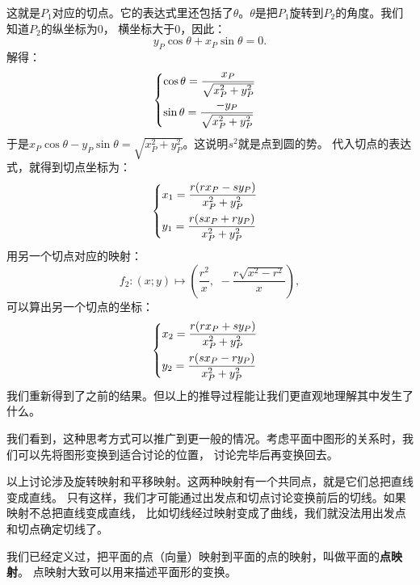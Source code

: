 \documentclass[12pt,UTF8]{ctexbook}
\begin{document}
这就是$P_1$对应的切点。它的表达式里还包括了$\theta$。$\theta$是把$P_1$旋转到$P_2$的角度。我们知道$P_2$的纵坐标为$0$，
横坐标大于$0$，因此：
$$ y_P \cos{\theta} + x_P\sin{\theta} = 0. $$
解得：
\begin{alignat*}{1}
&   \begin{dcases}
        \cos{\theta} = \frac{x_P}{\sqrt{x_P^2 + y_P^2}} \\
        \sin{\theta} = \frac{-y_P}{\sqrt{x_P^2 + y_P^2}} 
    \end{dcases}
\end{alignat*}
于是$x_P\cos{\theta} - y_P\sin{\theta} = \sqrt{x_P^2 + y_P^2}$。这说明$s^2$就是点到圆的势。
代入切点的表达式，就得到切点坐标为：
\begin{alignat*}{1}
    &   \begin{dcases}
    x_1 = \frac{r(rx_P - sy_P) }{x_P^2+y_P^2} \\
    y_1 = \frac{r(sx_P + ry_P)}{x_P^2+y_P^2}
\end{dcases}
\end{alignat*}
用另一个切点对应的映射：
$$f_2: (x; y) \mapsto \left(\frac{r^2}{x},\,\, -\frac{r\sqrt{x^2 - r^2}}{x}\right),$$
可以算出另一个切点的坐标：
\begin{alignat*}{1}
    &   \begin{dcases}
        x_2 = \frac{r(rx_P + sy_P) }{x_P^2+y_P^2} \\
        y_2 = \frac{r(sx_P - ry_P)}{x_P^2+y_P^2}
    \end{dcases}
\end{alignat*}
我们重新得到了之前的结果。但以上的推导过程能让我们更直观地理解其中发生了什么。

我们看到，这种思考方式可以推广到更一般的情况。考虑平面中图形的关系时，我们可以先将图形变换到适合讨论的位置，
讨论完毕后再变换回去。

以上讨论涉及旋转映射和平移映射。这两种映射有一个共同点，就是它们总把直线变成直线。
只有这样，我们才可能通过出发点和切点讨论变换前后的切线。如果映射不总把直线变成直线，
比如切线经过映射变成了曲线，我们就没法用出发点和切点确定切线了。

我们已经定义过，把平面的点（向量）映射到平面的点的映射，叫做平面的\textbf{点映射}。
点映射大致可以用来描述平面形的变换。
\end{document}
